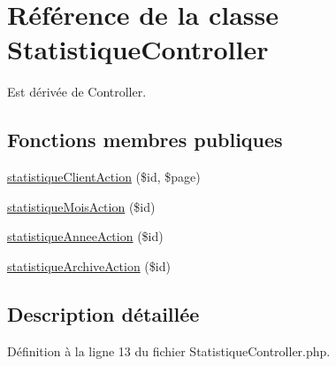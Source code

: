 \hypertarget{class_my_app_1_1_admin_bundle_1_1_controller_1_1_statistique_controller}{\section{Référence de la classe Statistique\-Controller}
\label{class_my_app_1_1_admin_bundle_1_1_controller_1_1_statistique_controller}
}


Est dérivée de Controller.

\subsection*{Fonctions membres publiques}
\begin{DoxyCompactItemize}
\item 
\hyperlink{class_my_app_1_1_admin_bundle_1_1_controller_1_1_statistique_controller_a861fa248cac8e9eb3c2ffb0dbf5ad9da}{statistique\-Client\-Action} (\$id, \$page)
\item 
\hyperlink{class_my_app_1_1_admin_bundle_1_1_controller_1_1_statistique_controller_a8db3623c5b3b20baca85483196ca45d1}{statistique\-Mois\-Action} (\$id)
\item 
\hyperlink{class_my_app_1_1_admin_bundle_1_1_controller_1_1_statistique_controller_af1e22fdcbbd752ec387f3cb49ec94ef5}{statistique\-Annee\-Action} (\$id)
\item 
\hyperlink{class_my_app_1_1_admin_bundle_1_1_controller_1_1_statistique_controller_abddf748fd5894608f03cac2420fd690a}{statistique\-Archive\-Action} (\$id)
\end{DoxyCompactItemize}


\subsection{Description détaillée}


Définition à la ligne 13 du fichier Statistique\-Controller.\-php.



